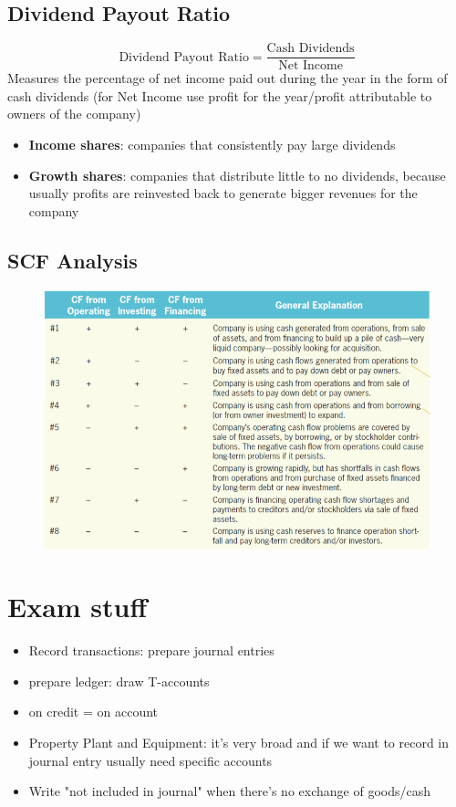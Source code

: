 \documentclass{article}
\begin{document}
\begin{multicols}{2}
\subsection{Dividend Payout Ratio}
$$\text{Dividend Payout Ratio} = \frac{\text{Cash Dividends}}{\text{Net Income}}$$
Measures the percentage of net income paid out during the year in the form of cash dividends (for Net Income use profit for the year/profit attributable to owners of the company)
\begin{itemize}
	\item \textbf{Income shares}: companies that consistently pay large dividends
	\item \textbf{Growth shares}: companies that distribute little to no dividends, because usually profits are reinvested back to generate bigger revenues for the company
\end{itemize}

\subsection{SCF Analysis}
\begin{figure}[H]
	\centering
	\includegraphics[width=\columnwidth]{image/scf_analysis.png}
\end{figure}

\section{Exam stuff}
\begin{itemize}
	\item Record transactions: prepare journal entries
	\item prepare ledger: draw T-accounts
	\item on credit = on account
	\item Property Plant and Equipment: it's very broad and if we want to record in journal entry usually need specific accounts
	\item Write "not included in journal" when there's no exchange of goods/cash
\end{itemize}
\end{multicols}
\end{document}
